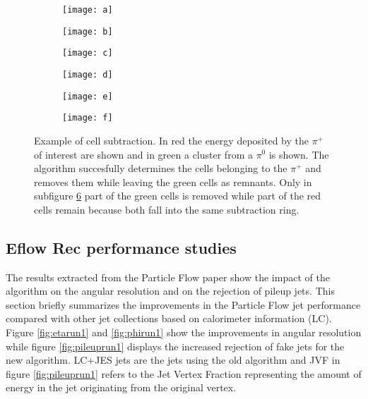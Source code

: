 \begin{figure}[htbp]
  \centering
  \begin{subfigure}[b]{0.3\figwidth}
    \texttt{[image: a]}
    \caption{}\label{fig:sub-a}
  \end{subfigure}
  \begin{subfigure}[b]{0.3\figwidth}
    \texttt{[image: b]}
    \caption{}\label{fig:sub-b}
  \end{subfigure}
  \begin{subfigure}[b]{0.3\figwidth}
    \texttt{[image: c]}
    \caption{}\label{fig:sub-c}
  \end{subfigure}
  \begin{subfigure}[b]{0.3\figwidth}
    \texttt{[image: d]}
    \caption{}\label{fig:sub-d}
  \end{subfigure}
    
    
  \begin{subfigure}[b]{0.3\figwidth}
        \texttt{[image: e]}
        \caption{}\label{fig:sub-e}
  \end{subfigure}
  \begin{subfigure}[b]{0.3\figwidth}
        \texttt{[image: f]}
        \caption{}\label{fig:sub-f}
  \end{subfigure}
  \caption{Example of cell subtraction. In red the energy deposited by the $\pi ^+$ of interest are shown and in green a cluster from a $\pi ^0$ is shown. The algorithm succesfully determines the cells belonging to the $\pi ^+$ and removes them while leaving the green cells as remnants. Only in subfigure \ref{fig:sub-f} part of the green cells is removed while part of the red cells remain because both fall into the same subtraction ring. \cite{pflow16}}
  \label{fig:sub}
\end{figure}


\subsection{Eflow Rec performance studies}

The results extracted from the Particle Flow paper \cite{pflow16} show the impact of the algorithm on the angular resolution and on the rejection of pileup jets. This section briefly summarizes the improvements in the Particle Flow jet performance compared with other jet collections based on calorimeter information (LC). Figure \ref{fig:etarun1} and \ref{fig:phirun1} show the improvements in angular resolution while figure \ref{fig:pileuprun1} displays the increased rejection of fake jets for the new algorithm. LC+JES jets are the jets using the old algorithm and JVF in figure \ref{fig:pileuprun1} refers to the Jet Vertex Fraction representing the amount of energy in the jet originating from the original vertex.

